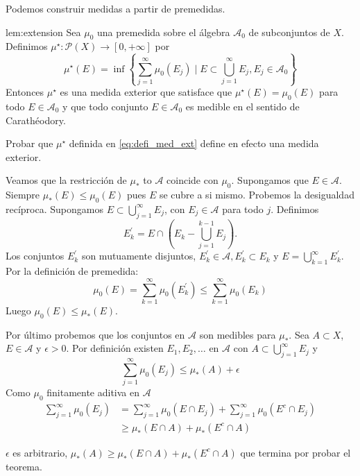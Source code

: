 Podemos construir medidas a partir de premedidas.

\begin{lema}{lem:extension}
 Sea $\mu_0$ una premedida sobre el álgebra  $\mathscr{A}_0$ de subconjuntos de $X$. Definimos  $\mu^\star:\mathcal{P}(X)\to [0,+\infty]$ por
 \begin{equation}\label{eq:defi_med_ext}
  \mu^\star(E)=\inf\left\{ \sum_{j=1}^{\infty}\mu_0(E_j)\mid E\subset \bigcup_{j=1}^{\infty}E_j, E_j\in\mathcal{A}_0  \right\}
 \end{equation}
 Entonces $\mu^\star$ es una medida exterior que satisface que $\mu^\star(E)=\mu_0(E)$ para todo $E\in\mathcal{A}_0$ y que todo conjunto 
$E\in\mathcal{A}_0$ es medible en el sentido de Carathéodory. 
\end{lema}

 \begin{demo} 
  


\begin{ejercicio}{} Probar que $\mu^\star$ definida en \eqref{eq:defi_med_ext} define en efecto una medida exterior.
 
\end{ejercicio}

Veamos que la restricción de $\mu_{*}$ to $\mathcal{A}$ coincide con $\mu_{0}$. Supongamos que $E \in \mathcal{A}$. Siempre $\mu_{*}(E) \leq \mu_{0}(E)$ pues $E$ se cubre a si mismo. Probemos la desigualdad recíproca. Supongamos  $E \subset \bigcup_{j=1}^{\infty} E_{j}$, con $E_{j} \in \mathcal{A}$ para todo $j$. Definimos
$$
E_{k}^{\prime}=E \cap\left(E_{k}-\bigcup_{j=1}^{k-1} E_{j}\right)
.$$
Los conjuntos $E_{k}^{\prime}$ son mutuamente disjuntos, $E_{k}^{\prime}\in \mathcal{A}, E_{k}^{\prime} \subset E_{k}$ y $E=\bigcup_{k=1}^{\infty} E_{k}^{\prime}$. Por la definición de premedida:
$$
\mu_{0}(E)=\sum_{k=1}^{\infty} \mu_{0}\left(E_{k}^{\prime}\right) \leq \sum_{k=1}^{\infty} \mu_{0}\left(E_{k}\right)
$$
Luego  $\mu_{0}(E) \leq \mu_{*}(E)$.

Por último probemos que los conjuntos en $\mathcal{A}$ son medibles para $\mu_{*}$. Sea $A\subset X$, $E \in \mathcal{A}$ y $\epsilon>0$. Por definición existen  $E_{1}, E_{2}, \ldots$ en $\mathcal{A}$ con $A \subset \bigcup_{j=1}^{\infty} E_{j}$ y
$$
\sum_{j=1}^{\infty} \mu_{0}\left(E_{j}\right) \leq \mu_{*}(A)+\epsilon
$$
Como $\mu_{0}$  finitamente  aditiva en $\mathcal{A}$ 
$$
\begin{aligned}
\sum_{j=1}^{\infty} \mu_{0}\left(E_{j}\right) &=\sum_{j=1}^{\infty} \mu_{0}\left(E \cap E_{j}\right)+\sum_{j=1}^{\infty} \mu_{0}\left(E^{c} \cap E_{j}\right) \\
& \geq \mu_{*}(E \cap A)+\mu_{*}\left(E^{c} \cap A\right)
\end{aligned}
$$

$\epsilon$ es arbitrario,  $\mu_{*}(A) \geq \mu_{*}(E \cap A)+\mu_{*}\left(E^{c} \cap A\right)$ que termina por probar el teorema. \end{demo}

